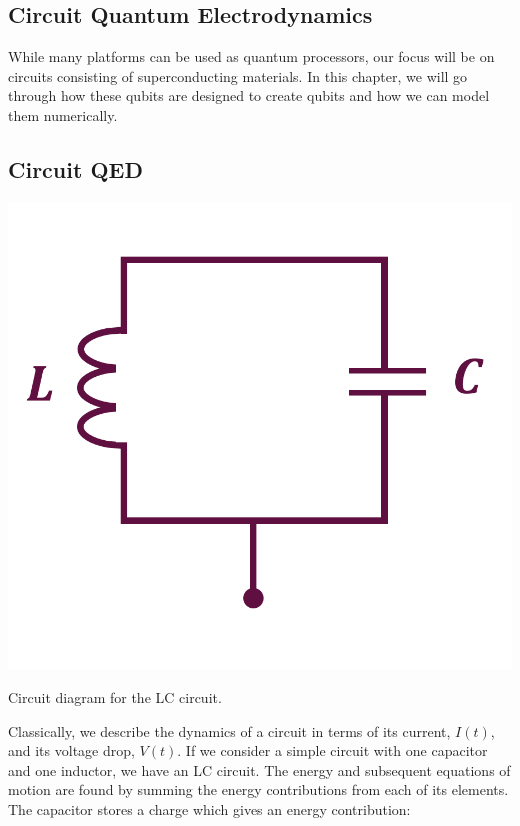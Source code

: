 \begin{fullwidth}
\chapter{Circuit Quantum Electrodynamics}\label{chap:cQED}
\end{fullwidth}
While many platforms can be used as quantum processors, our focus will be on circuits consisting of superconducting materials. In this chapter, we will go through how these qubits are designed to create qubits and how we can model them numerically. \\

\section{Circuit QED}
\begin{marginfigure}[5 cm]
    \includegraphics[width = \linewidth]{tex/fig_for_text/LC_circuit.png}
    \caption{Circuit diagram for the LC circuit.}
\end{marginfigure}
Classically, we describe the dynamics of a circuit in terms of its current, $I(t)$, and its voltage drop, $V(t)$. If we consider a simple circuit with one capacitor and one inductor, we have an LC circuit. The energy and subsequent equations of motion are found by summing the energy contributions from each of its elements. The capacitor stores a charge which gives an energy contribution:
